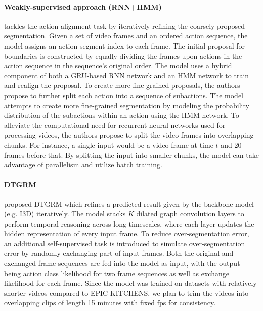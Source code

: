 \paragraph{Weakly-supervised approach (RNN+HMM)}
 tackles the action alignment task by iteratively refining the coarsely proposed segmentation. Given a set of video frames and an ordered action sequence, the model assigns an action segment index to each frame. The initial proposal for boundaries is constructed by equally dividing the frames upon actions in the action sequence in the sequence's original order. The model uses a hybrid component of both a GRU-based RNN network and an HMM network to train and realign the proposal. To create more fine-grained proposals, the authors propose to further split each action into a sequence of subactions. The model attempts to create more fine-grained segmentation by modeling the probability distribution of the subactions within an action using the HMM network. To alleviate the computational need for recurrent neural networks used for processing videos, the authors propose to split the video frames into overlapping chunks. For instance, a single input would be a video frame at time $t$ and 20 frames before that. By splitting the input into smaller chunks, the model can take advantage of parallelism and utilize batch training.

\paragraph{DTGRM}

 proposed DTGRM which refines a predicted result given by the backbone model (e.g. I3D) iteratively. The model stacks $K$ dilated graph convolution layers to perform temporal reasoning across long timescales, where each layer updates the hidden representation of every input frame. To reduce over-segmentation error, an additional self-supervised task is introduced to simulate over-segmentation error by randomly exchanging part of input frames. Both the original and exchanged frame sequences are fed into the model as input, with the output being action class likelihood for two frame sequences as well as exchange likelihood for each frame. Since the model was trained on datasets with relatively shorter videos compared to EPIC-KITCHENS, we plan to trim the videos into overlapping clips of length 15 minutes with fixed fps for consistency.
